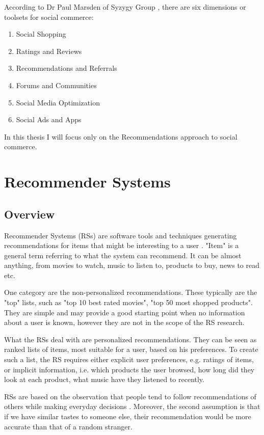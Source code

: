 \documentclass[12pt]{report}
\begin{document}
According to Dr Paul Marsden of Syzygy Group \cite{social_commerce_syzygy}, there are six dimensions or toolsets for social commerce:
\begin{enumerate}
\item Social Shopping
\item Ratings and Reviews
\item Recommendations and Referrals
\item Forums and Communities
\item Social Media Optimization
\item Social Ads and Apps
\end{enumerate}

In this thesis I will focus only on the Recommendations approach to social commerce.

\section{Recommender Systems}

\subsection{Overview}

Recommender Systems (RSs) are software tools and techniques generating recommendations for items that might be interesting to a user \cite{rec_sys_handbook}. "Item" is a general term referring to what the system can recommend. It can be almost anything, from movies to watch, music to listen to, products to buy, news to read etc.

One category are the non-personalized recommendations. These typically are the "top" lists, such as "top 10 best rated movies", "top 50 most shopped products". They are simple and may provide a good starting point when no information about a user is known, however they are not in the scope of the RS research.

What the RSs deal with are personalized recommendations. They can be seen as ranked lists of items, most suitable for a user, based on his preferences. To create such a list, the RS requires either explicit user preferences, e.g. ratings of items, or implicit information, i.e. which products the user browsed, how long did they look at each product, what music have they listened to recently.

RSs are based on the observation that people tend to follow recommendations of others while making everyday decisions \cite{rec_sys_handbook}. Moreover, the second assumption is that if we have similar tastes to someone else, their recommendation would be more accurate than that of a random stranger.
\end{document}
